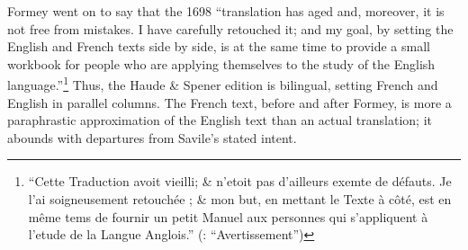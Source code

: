 \documentclass[output=paper]{langscibook}
\begin{document}
Formey went on to say that the 1698 “translation has aged and, moreover, it is not free from mistakes. I have carefully retouched it; and my goal, by setting the English and French texts side by side, is at the same time to provide a small workbook for people who are applying themselves to the study of the English language.”\footnote{“Cette Traduction avoit vieilli; \& n’etoit pas d’ailleurs exemte de défauts. Je l’ai soigneusement retouchée ; \& mon but, en mettant le Texte à côté, est en même tems de fournir un petit Manuel aux personnes qui s’appliquent à l’etude de la Langue Anglois.” (\citealt{Savile1752}:  “Avertissement”)}  Thus, the Haude \& Spener edition is bilingual, setting French and English in parallel columns. The French text, before and after Formey, is more a paraphrastic approximation of the English text than an actual translation; it abounds with departures from Savile’s stated intent.
\end{document}
